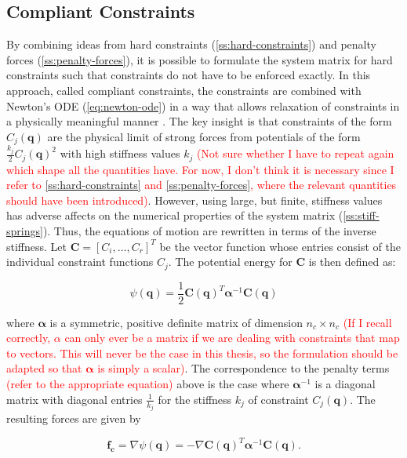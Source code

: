 \subsection{Compliant Constraints}\label{ss:compliant-constraints}
By combining ideas from hard constraints (\cref{ss:hard-constraints}) and penalty forces (\cref{ss:penalty-forces}), it is possible to 
formulate the system matrix for hard constraints such that constraints do not have to be enforced exactly. In this approach, called compliant 
constraints, the constraints are combined with Newton's ODE (\cref{eq:newton-ode}) in a way that allows relaxation of constraints in a 
physically meaningful manner \cite{servin2006}. The key insight is that constraints 
of the form $C_j(\bm{q})$ are the physical limit of strong forces from potentials of the form $\frac{k_j}{2}C_j(\bm{q})^2$ with 
high stiffness values $k_j$ \textcolor{red}{(Not sure whether I have to repeat again which shape all the quantities have. For now, I don't think 
it is necessary since I refer to \cref{ss:hard-constraints} and \cref{ss:penalty-forces}, where the relevant quantities should have been 
introduced)}. However, 
using large, but finite, stiffness values has adverse affects on the numerical properties of the system matrix 
(\cref{ss:stiff-springs}). Thus, the equations of motion are rewritten in terms of the inverse stiffness. Let $\bm{C} = [C_i, \ldots, C_r]^T$ be 
the vector function whose entries consist of the individual constraint functions $C_j$. The potential energy for $\bm{C}$ is then defined as:

\begin{equation}\label{eq:compliant-potential}
    \psi(\bm{q}) = \frac{1}{2}\bm{C}(\bm{q})^T \bm{\alpha}^{-1}\bm{C}(\bm{q})
\end{equation}

\noindent where $\bm{\alpha}$ is a symmetric, positive definite matrix of dimension $n_c \times n_c$ \textcolor{red}{(If I recall correctly, 
$\alpha$ can only
ever be a matrix if we are dealing with constraints that map to vectors. This will never be the case in this thesis, so the formulation should
be adapted so that $\bm{\alpha}$ is simply a scalar)}. The correspondence to the penalty terms \textcolor{red}{(refer to the appropriate equation)} 
above is the case where $\bm{\alpha}^{-1}$ is a diagonal 
matrix with diagonal entries $\frac{1}{k_j}$ for the stiffness $k_j$ of constraint $C_j(\bm{q})$. The resulting forces are given by 

\begin{equation}\label{eq:compliant-force}
    \bm{f_c} = \nabla \psi(\bm{q}) = -\nabla \bm{C}(\bm{q})^T\bm{\alpha}^{-1} \bm{C}(\bm{q}).
\end{equation}

